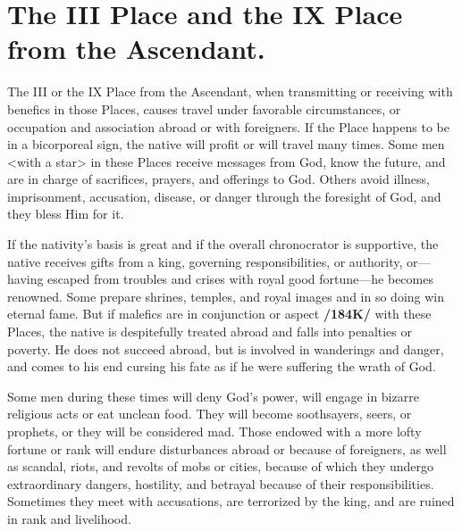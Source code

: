 \section{The III Place and the IX Place from the Ascendant.}

The III or the IX Place from the Ascendant, when transmitting or receiving with benefics in those Places, causes travel under favorable circumstances, or occupation and association abroad or with foreigners. If the Place happens to be in a bicorporeal sign, the native will profit or will travel many times. Some men <with a star> in these Places receive messages from God, know the future, and are in charge of sacrifices, prayers, and offerings to God. Others avoid illness, imprisonment, accusation, disease, or danger through the foresight of God, and they bless Him for it. 

If the nativity’s basis is great and if the overall chronocrator is supportive, the native receives gifts from a king, governing responsibilities, or authority, or—having escaped from troubles and crises with royal good fortune—he becomes renowned. Some prepare shrines, temples, and royal images and in so doing win eternal fame. But if malefics are in conjunction or aspect \textbf{/184K/} with these Places, the native is despitefully treated abroad and falls into penalties or poverty. He does not succeed abroad, but is involved in wanderings and danger, and comes to his end cursing his fate as if he were suffering the wrath of God. 

\enlargethispage{2\baselineskip}
Some men during these times will deny God’s power, will engage in bizarre religious acts or eat unclean food. They will become soothsayers, seers, or prophets, or they will be considered mad. Those endowed with a more lofty fortune or rank will endure disturbances abroad or because of foreigners, as well as scandal, riots, and revolts of mobs or cities, because of which they undergo extraordinary dangers, hostility, and betrayal because of their responsibilities. Sometimes they meet with accusations, are terrorized by the king, and are ruined in rank and livelihood.

\newpage
